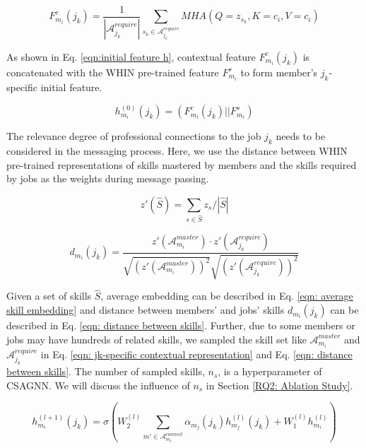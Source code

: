 \begin{equation}
\label{eqn: jk-specific contextual representation}
F_{m_i}^c(j_k) = \frac{1}{\left |\mathcal{A}_{j_k}^{require}\right |}\sum_{s_k \in \mathcal{A}_{j_k}^{require}}{
MHA(Q=z_{s_k}, K=c_i, V=c_i)
}
\end{equation}

As shown in Eq. \ref{eqn:initial feature h}, contextual feature $F_{m_i}^c(j_k)$ is concatenated with the WHIN pre-trained feature $F_{m_i}^s$ to form member's $j_k$-specific initial feature.

\begin{equation}
    \label{eqn:initial feature h}
    h_{m_i}^{(0)}(j_k) = (F_{m_i}^c(j_k) || F_{m_i}^s)
\end{equation}

The relevance degree of professional connections to the job $j_k$ needs to be considered in the messaging process. Here, we use the distance between WHIN pre-trained representations of skills mastered by members and the skills required by jobs as the weights during message passing.

\begin{equation}
    \label{eqn: average skill embedding}
    z'({\hat{S}}) = {\sum_{s \in \hat{S}}{z_s}}/|\hat{S}|
\end{equation}

\begin{equation}
    \label{eqn: distance between skills}
    d_{m_i}(j_k) = \frac{z'(\mathcal{A}_{m_i}^{master})\cdot z'(\mathcal{A}_{j_k}^{require})}{\sqrt{(z'(\mathcal{A}_{m_i}^{master}))^2}\sqrt{(z'(\mathcal{A}_{j_k}^{require}))^2}}
\end{equation}

Given a set of skills $\hat{S}$, average embedding can be described in Eq. \ref{eqn: average skill embedding} and distance between members' and jobs' skills $d_{m_i}(j_k)$ can be described in Eq. \ref{eqn: distance between skills}. Further, due to some members or jobs may have hundreds of related skills, we sampled the skill set like $\mathcal{A}_{m_i}^{master}$ and $\mathcal{A}_{j_k}^{require}$ in Eq. \ref{eqn: jk-specific contextual representation} and Eq. \ref{eqn: distance between skills}. The number of sampled skills, $n_s$, is a hyperparameter of CSAGNN. We will discuss the influence of $n_s$ in Section \ref{RQ2: Ablation Study}.

\begin{equation}
    \label{eqn: social message passing}
    h_{m_i}^{(l+1)}(j_k) = \sigma {\left(W_{2}^{(l)}\sum_{m'\in \mathcal{A}_{m_i}^{connect}}\alpha_{m_j}(j_k)h_{m_j}^{(l)}(j_k)+W_1^{(l)} h_{m_i}^{(l)}\right)}
\end{equation}

